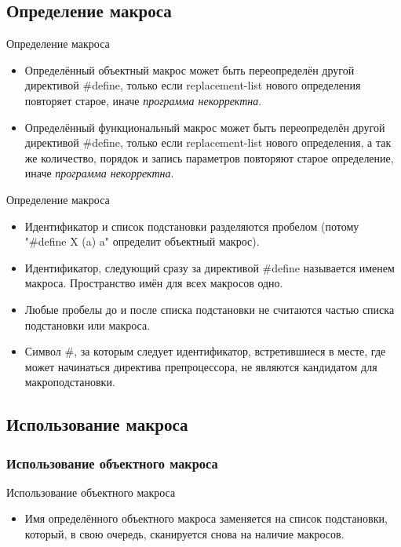     \subsection{Определение макроса}
    \begin{frame}{Определение макроса}
        \begin{itemize}
            \item Определённый объектный макрос может быть переопределён другой директивой \#define,
                только если replacement-list нового определения повторяет старое, иначе \textit{программа некорректна}.
            \item Определённый функциональный макрос может быть переопределён другой директивой \#define,
                только если replacement-list нового определения, а так же количество, порядок и запись параметров
                повторяют старое определение, иначе \textit{программа некорректна}.
        \end{itemize}
    \end{frame}
    \begin{frame}{Определение макроса}
        \begin{itemize}
            \item Идентификатор и список подстановки разделяются пробелом (потому "\#define X (a) a" определит объектный макрос).
            \item Идентификатор, следующий сразу за директивой \#define называется именем макроса. Пространство имён для всех макросов одно.
            \item Любые пробелы до и после списка подстановки не считаются частью списка подстановки или макроса.
            \item Символ \#, за которым следует идентификатор, встретившиеся в месте, где может начинаться директива препроцессора,
                не являются кандидатом для макроподстановки.
        \end{itemize}
    \end{frame}
    \subsection{Использование макроса}
    \subsubsection{Использование объектного макроса}
    \begin{frame}{Использование объектного макроса}
        \begin{itemize}
            \item Имя определённого объектного макроса заменяется на список подстановки, который, в свою очередь,
                сканируется снова на наличие макросов.
        \end{itemize}
    \end{frame}
